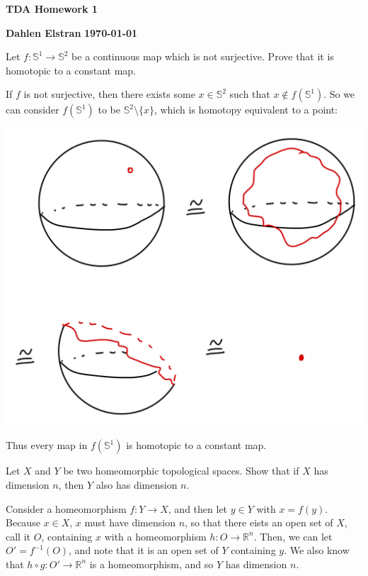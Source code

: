 \documentclass[12pt]{article}
\newcommand{\Sp}{\mathbb{S}}
\begin{document}
\begin{newtitle}
  \begin{center}
    \textbf{\Huge TDA Homework 1}
  \end{center}
  \textbf{Dahlen Elstran} \hfill \textbf{\today}
\end{newtitle}

\begin{statement}
  Let $f: \Sp^1 \rightarrow \Sp^2$ be a continuous map which is not surjective. Prove that it is homotopic to a constant map.
\end{statement}
\begin{newproof}
  If $f$ is not surjective, then there exists some $x \in \Sp^2$ such that $x \notin f(\Sp^1)$. So we can consider 
  $f(\Sp^1)$ to be $\Sp^2 \setminus \{x\}$, which is homotopy equivalent to a point:
  \par \begin{center} \includegraphics[scale=.2]{1-1.png} \end{center}
  Thus every map in $f(\Sp^1)$ is homotopic to a constant map. 
\end{newproof}

\begin{statement}
  Let $X$ and $Y$ be two homeomorphic topological spaces. Show that if $X$ has dimension $n$, then $Y$ also has dimension $n$.
\end{statement}
\begin{newproof}
   Consider a homeomorphism $f: Y \to X$, and then let $y \in Y$ with $x = f(y)$. Because $x \in X$, $x$ must have dimension 
   $n$, so that there eists an open set of $X$, call it $O$, containing $x$ with a homeomorphism $h: O \to \mathbb{R}^n$. 
   Then, we can let $O'=f^{-1}(O)$, and note that it is an open set of $Y$ containing $y$. We also know that 
   $h \circ g: O' \to \mathbb{R}^n$ is a homeomorphism, and so $Y$ has dimension $n$.
\end{newproof}
\end{document}
